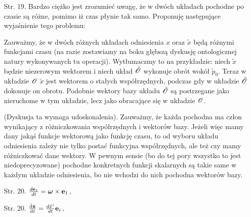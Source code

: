 \documentclass[a4paper,11pt]{article}
\begin{document}
\vspace{\spaceTwo}














\start {}

\vspace{\spaceFour}



\start Str. 19. Bardzo ciężko jest zrozumieć uwagę, że w dwóch układach pochodne po czasie są różne, pomimo iż czas płynie tak samo. Proponuję następujące wyjaśnienie tego problemu:

Zauważmy, że w dwóch różnych układach odniesienia $x$ oraz
$\tilde{ x }$ będą różnymi funkcjami czasu (na razie zostawiamy na
boku głębszą dyskusję ontologicznej natury wykonywanych tu operacji).
Wytłumaczmy to na przykładzie: niech $\tilde{ x }$ będzie niezerowym
wektorem i niech układ $\tilde{ \mathcal{O} }$ wykonuje obrót wokół
$\tilde{ p }_{ 0 }$. Teraz w układzie $\mathcal{O}$ $\tilde{ x }$
jest wektorem o stałych współrzędnych, podczas gdy w układzie
$\tilde{ \mathcal{O} }$ dokonuje on obrotu. Podobnie wektory bazy
układu $\tilde{ \mathcal{O} }$ są postrzegane jako nieruchome w tym
układzie, lecz jako obracające się w
układzie $\mathcal{O}$.

(Dyskusja ta wymaga udoskonalenia). Zauważmy, że każda pochodna ma
człon wynikający z różniczkowania współrzędnych i wektorów bazy.
Jeżeli więc mamy dany jakąś funkcje wektorową jako funkcję czasu, to
od wyboru układu odniesienia zależy nie tylko postać funkcyjna
współrzędnych, ale też czy mamy różniczkować dane wektory. W pewnym
sensie (bo do tej pory wszystko to jest niedoprecyzowane) pochodne
konkretnych funkcji skalarnych są takie same w każdym układzie
odniesienia, bo nie wchodzi do nich pochodna wektorów bazy.



Str. 20.
$\frac{ d\mathbf{e}_{ 1 } }{ dt } = \boldsymbol{\omega} \times \mathbf{e}_{ 1 } \, ,$

Str. 20.
$\frac{ \tilde{ \mathrm{d} } \tilde{ \mathbf{x} } }{ \mathrm{d} t }
= \frac{ d\tilde{ x }^{ i } }{ dt } \mathbf{e}_{ i } \, ,$
\end{document}
